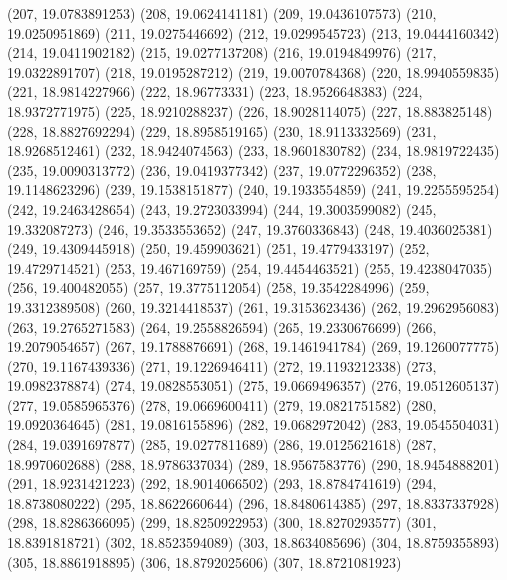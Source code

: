 {					(207, 19.0783891253)
					(208, 19.0624141181)
					(209, 19.0436107573)
					(210, 19.0250951869)
					(211, 19.0275446692)
					(212, 19.0299545723)
					(213, 19.0444160342)
					(214, 19.0411902182)
					(215, 19.0277137208)
					(216, 19.0194849976)
					(217, 19.0322891707)
					(218, 19.0195287212)
					(219, 19.0070784368)
					(220, 18.9940559835)
					(221, 18.9814227966)
					(222, 18.96773331)
					(223, 18.9526648383)
					(224, 18.9372771975)
					(225, 18.9210288237)
					(226, 18.9028114075)
					(227, 18.883825148)
					(228, 18.8827692294)
					(229, 18.8958519165)
					(230, 18.9113332569)
					(231, 18.9268512461)
					(232, 18.9424074563)
					(233, 18.9601830782)
					(234, 18.9819722435)
					(235, 19.0090313772)
					(236, 19.0419377342)
					(237, 19.0772296352)
					(238, 19.1148623296)
					(239, 19.1538151877)
					(240, 19.1933554859)
					(241, 19.2255595254)
					(242, 19.2463428654)
					(243, 19.2723033994)
					(244, 19.3003599082)
					(245, 19.332087273)
					(246, 19.3533553652)
					(247, 19.3760336843)
					(248, 19.4036025381)
					(249, 19.4309445918)
					(250, 19.459903621)
					(251, 19.4779433197)
					(252, 19.4729714521)
					(253, 19.467169759)
					(254, 19.4454463521)
					(255, 19.4238047035)
					(256, 19.400482055)
					(257, 19.3775112054)
					(258, 19.3542284996)
					(259, 19.3312389508)
					(260, 19.3214418537)
					(261, 19.3153623436)
					(262, 19.2962956083)
					(263, 19.2765271583)
					(264, 19.2558826594)
					(265, 19.2330676699)
					(266, 19.2079054657)
					(267, 19.1788876691)
					(268, 19.1461941784)
					(269, 19.1260077775)
					(270, 19.1167439336)
					(271, 19.1226946411)
					(272, 19.1193212338)
					(273, 19.0982378874)
					(274, 19.0828553051)
					(275, 19.0669496357)
					(276, 19.0512605137)
					(277, 19.0585965376)
					(278, 19.0669600411)
					(279, 19.0821751582)
					(280, 19.0920364645)
					(281, 19.0816155896)
					(282, 19.0682972042)
					(283, 19.0545504031)
					(284, 19.0391697877)
					(285, 19.0277811689)
					(286, 19.0125621618)
					(287, 18.9970602688)
					(288, 18.9786337034)
					(289, 18.9567583776)
					(290, 18.9454888201)
					(291, 18.9231421223)
					(292, 18.9014066502)
					(293, 18.8784741619)
					(294, 18.8738080222)
					(295, 18.8622660644)
					(296, 18.8480614385)
					(297, 18.8337337928)
					(298, 18.8286366095)
					(299, 18.8250922953)
					(300, 18.8270293577)
					(301, 18.8391818721)
					(302, 18.8523594089)
					(303, 18.8634085696)
					(304, 18.8759355893)
					(305, 18.8861918895)
					(306, 18.8792025606)
					(307, 18.8721081923)
}

